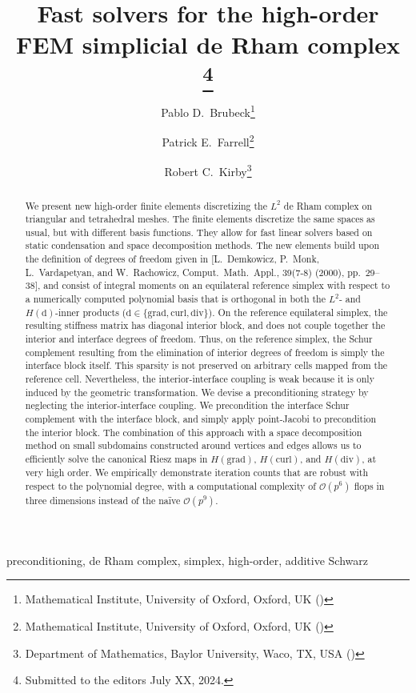 \documentclass[review,onefignum,onetabnum,a4paper]{siamart190516}
\title{
   Fast solvers for the high-order FEM simplicial de Rham complex
\thanks{Submitted to the editors July XX, 2024.
      \funding{
         PDB and PEF were supported by EPSRC grant EP/W026260/1.
      }
   }
}
\author{Pablo D.\ Brubeck\thanks{
Mathematical Institute,
University of Oxford,
Oxford, UK (\email{brubeckmarti@maths.ox.ac.uk})
}
\and Patrick E.\ Farrell\thanks{
Mathematical Institute,
University of Oxford,
Oxford, UK (\email{patrick.farrell@maths.ox.ac.uk})
}
\and Robert C.\ Kirby\thanks{
Department of Mathematics,
Baylor University,
Waco, TX, USA (\email{robert\_kirby@baylor.edu})
}
}
\begin{document}
\maketitle

\begin{abstract}
We present new high-order finite elements discretizing the $L^2$ de Rham
complex on triangular and tetrahedral meshes. The finite elements discretize
the same spaces as usual, but with different basis functions. They allow for
fast linear solvers based on static condensation and space decomposition
methods. The new elements build upon the definition of degrees of freedom
given in [L.~Demkowicz, P.~Monk, L.~Vardapetyan, and W.~Rachowicz,
Comput.~Math.~Appl.,
39(7-8) (2000), pp.~29--38], and consist of integral moments
on an equilateral reference simplex with respect to a numerically computed
polynomial basis that is orthogonal in both the $L^2$- and
$H(\mathrm{d})$-inner products ($\mathrm{d} \in \{\mathrm{grad},
\mathrm{curl}, \mathrm{div}\}$). 
On the reference equilateral simplex, the
resulting stiffness matrix has diagonal interior block, and does not couple
together the interior and interface degrees of freedom. Thus, on the
reference simplex, the Schur complement resulting from the elimination of
interior degrees of freedom is simply the interface block itself. This
sparsity is not preserved on arbitrary cells mapped from the reference cell.
Nevertheless, the interior-interface coupling is weak because it is only
induced by the geometric transformation. We devise a preconditioning
strategy by neglecting the interior-interface coupling. We precondition the
interface Schur complement with the interface block, and simply apply
point-Jacobi to precondition the interior block. The combination of this
approach with a space decomposition method on small subdomains constructed
around vertices and edges allows us to efficiently solve the
canonical Riesz maps in $H(\mathrm{grad})$, $H(\mathrm{curl})$, and
$H(\mathrm{div})$, at very high order. We empirically demonstrate iteration
counts that are robust with respect to the polynomial degree, with a computational complexity of $\mathcal{O}(p^{6})$ flops in three dimensions
instead of the na\"ive $\mathcal{O}(p^{9})$.
\end{abstract}

\begin{keywords}
   preconditioning, de Rham complex, simplex, high-order, additive Schwarz
\end{keywords}
\end{document}
